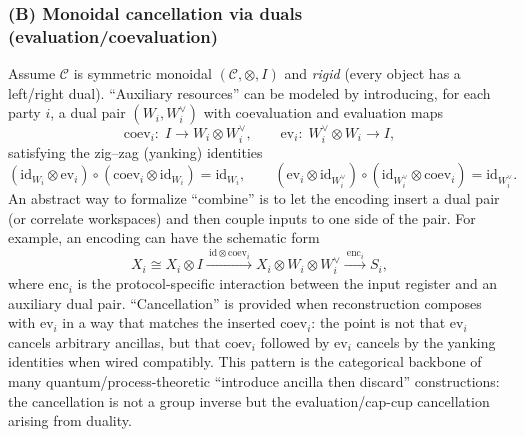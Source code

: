 \documentclass[11pt,a4paper]{article}
\theoremstyle{definition}
\theoremstyle{plain}
\begin{document}
\subsubsection{(B) Monoidal cancellation via duals (evaluation/coevaluation)}
\label{subsubsec:combine-cancel-duals}
Assume $\mathcal{C}$ is symmetric monoidal $(\mathcal{C},\otimes,I)$ and \emph{rigid} (every object has a left/right dual).
``Auxiliary resources'' can be modeled by introducing, for each party $i$, a dual pair $(W_i,W_i^\vee)$ with coevaluation and evaluation maps
\[
\mathrm{coev}_i:\; I \longrightarrow W_i\otimes W_i^\vee,
\qquad
\mathrm{ev}_i:\; W_i^\vee\otimes W_i \longrightarrow I,
\]
satisfying the zig--zag (yanking) identities
\[
(\mathrm{id}_{W_i}\otimes \mathrm{ev}_i)\circ (\mathrm{coev}_i\otimes \mathrm{id}_{W_i})=\mathrm{id}_{W_i},
\qquad
(\mathrm{ev}_i\otimes \mathrm{id}_{W_i^\vee})\circ (\mathrm{id}_{W_i^\vee}\otimes \mathrm{coev}_i)=\mathrm{id}_{W_i^\vee}.
\]
An abstract way to formalize ``combine'' is to let the encoding insert a dual pair (or correlate workspaces) and then couple inputs to one side of the pair.
For example, an encoding can have the schematic form
\[
X_i \cong X_i\otimes I
\xrightarrow{\ \mathrm{id}\otimes \mathrm{coev}_i\ }
X_i\otimes W_i\otimes W_i^\vee
\xrightarrow{\ \mathrm{enc}_i\ }
S_i,
\]
where $\mathrm{enc}_i$ is the protocol-specific interaction between the input register and an auxiliary dual pair.
``Cancellation'' is provided when reconstruction composes with $\mathrm{ev}_i$ in a way that matches the inserted $\mathrm{coev}_i$:
the point is not that $\mathrm{ev}_i$ cancels arbitrary ancillas, but that $\mathrm{coev}_i$ followed by $\mathrm{ev}_i$ cancels by the yanking identities when wired compatibly.
This pattern is the categorical backbone of many quantum/process-theoretic ``introduce ancilla then discard'' constructions: the cancellation is not a group inverse but the evaluation/cap-cup cancellation arising from duality.
\end{document}
